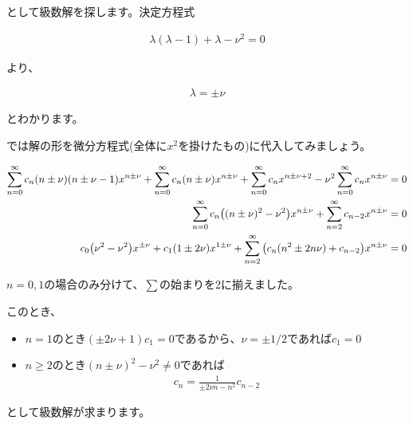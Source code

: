 \noindent
として級数解を探します。決定方程式

\begin{eqnarray}
    \lambda(\lambda-1)+\lambda-\nu^2=0
\end{eqnarray}

\noindent
より、

\begin{eqnarray}
    \lambda=\pm\nu
\end{eqnarray}

\noindent
とわかります。

では解の形を微分方程式(全体に$x^2$を掛けたもの)に代入してみましょう。

\begin{eqnarray}
    \sum_{n=0}^\infty c_n(n\pm\nu)(n\pm\nu-1)x^{n\pm\nu}+\sum_{n=0}^\infty c_n(n\pm\nu)x^{n\pm\nu}+\sum_{n=0}^\infty c_nx^{n\pm\nu+2}-\nu^2\sum_{n=0}^\infty c_nx^{n\pm\nu}=0 \\
    \sum_{n=0}^\infty c_n\pqty{(n\pm\nu)^2-\nu^2}x^{n\pm\nu}+\sum_{n=2}^\infty c_{n-2}x^{n\pm\nu}=0 \nonumber \\
    c_0\pqty{\nu^2-\nu^2}x^{\pm\nu}+c_1\pqty{1\pm2\nu}x^{1\pm\nu}+\sum_{n=2}^\infty \setcounter{equation}{214} \pqty{c_n(n^2\pm2n\nu)+c_{n-2}}x^{n\pm\nu}=0
\end{eqnarray}

$n=0,1$の場合のみ分けて、$\sum$の始まりを2に揃えました。

このとき、

\begin{itemize}
    \item $n=1$のとき$(\pm2\nu+1)c_1=0$であるから、$\nu=\pm1/2$であれば$c_1=0$
    \item $n\geq2$のとき$(n\pm\nu)^2-\nu^2\neq0$であれば
    \begin{eqnarray}
    c_n=\frac{1}{\pm2\nu n-n^2}c_{n-2}
    \end{eqnarray}
\end{itemize}

として級数解が求まります。


\clearpage